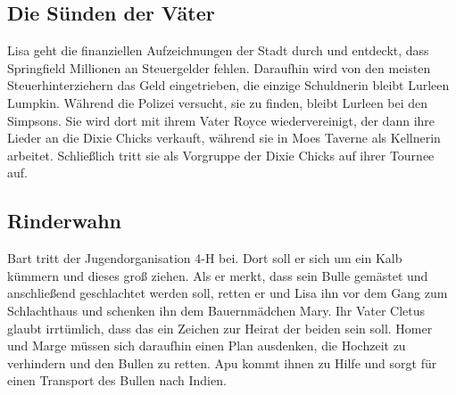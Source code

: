 

\subsection{Die Sünden der Väter}
Lisa geht die finanziellen Aufzeichnungen der Stadt durch und entdeckt, dass Springfield Millionen an Steuergelder fehlen. Daraufhin wird von den meisten Steuerhinterziehern das Geld eingetrieben, die einzige Schuldnerin bleibt Lurleen Lumpkin. Während die Polizei versucht, sie zu finden, bleibt Lurleen bei den Simpsons. Sie wird dort mit ihrem Vater Royce wiedervereinigt, der dann ihre Lieder an die Dixie Chicks verkauft, während sie in Moes Taverne als Kellnerin arbeitet. Schließlich tritt sie als Vorgruppe der Dixie Chicks auf ihrer Tournee auf. 


\subsection{Rinderwahn}
Bart tritt der Jugendorganisation 4-H bei. Dort soll er sich um ein Kalb kümmern und dieses groß ziehen. Als er merkt, dass sein Bulle gemästet und anschließend geschlachtet werden soll, retten er und Lisa ihn vor dem Gang zum Schlachthaus und schenken ihn dem Bauernmädchen Mary. Ihr Vater Cletus glaubt irrtümlich, dass das ein Zeichen zur Heirat der beiden sein soll. Homer und Marge müssen sich daraufhin einen Plan ausdenken, die Hochzeit zu verhindern und den Bullen zu retten. Apu kommt ihnen zu Hilfe und sorgt für einen Transport des Bullen nach Indien.

